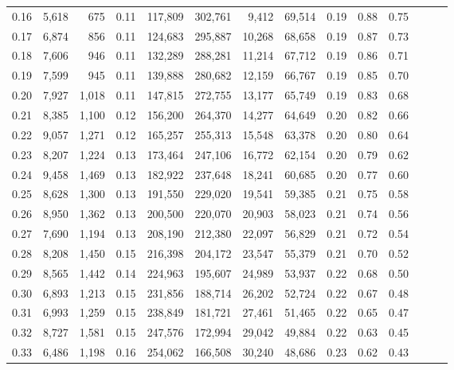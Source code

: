 \begin{tabular}{rrrrrrrrrrrrrr}
0.16 &   5,618 &    675 &  0.11 &  117,809 &  302,761 &   9,412 &  69,514 &  0.19 &  0.88 &      0.75 \\
0.17 &   6,874 &    856 &  0.11 &  124,683 &  295,887 &  10,268 &  68,658 &  0.19 &  0.87 &      0.73 \\
0.18 &   7,606 &    946 &  0.11 &  132,289 &  288,281 &  11,214 &  67,712 &  0.19 &  0.86 &      0.71 \\
0.19 &   7,599 &    945 &  0.11 &  139,888 &  280,682 &  12,159 &  66,767 &  0.19 &  0.85 &      0.70 \\
0.20 &   7,927 &  1,018 &  0.11 &  147,815 &  272,755 &  13,177 &  65,749 &  0.19 &  0.83 &      0.68 \\
0.21 &   8,385 &  1,100 &  0.12 &  156,200 &  264,370 &  14,277 &  64,649 &  0.20 &  0.82 &      0.66 \\
0.22 &   9,057 &  1,271 &  0.12 &  165,257 &  255,313 &  15,548 &  63,378 &  0.20 &  0.80 &      0.64 \\
0.23 &   8,207 &  1,224 &  0.13 &  173,464 &  247,106 &  16,772 &  62,154 &  0.20 &  0.79 &      0.62 \\
0.24 &   9,458 &  1,469 &  0.13 &  182,922 &  237,648 &  18,241 &  60,685 &  0.20 &  0.77 &      0.60 \\
0.25 &   8,628 &  1,300 &  0.13 &  191,550 &  229,020 &  19,541 &  59,385 &  0.21 &  0.75 &      0.58 \\
0.26 &   8,950 &  1,362 &  0.13 &  200,500 &  220,070 &  20,903 &  58,023 &  0.21 &  0.74 &      0.56 \\
0.27 &   7,690 &  1,194 &  0.13 &  208,190 &  212,380 &  22,097 &  56,829 &  0.21 &  0.72 &      0.54 \\
0.28 &   8,208 &  1,450 &  0.15 &  216,398 &  204,172 &  23,547 &  55,379 &  0.21 &  0.70 &      0.52 \\
0.29 &   8,565 &  1,442 &  0.14 &  224,963 &  195,607 &  24,989 &  53,937 &  0.22 &  0.68 &      0.50 \\
0.30 &   6,893 &  1,213 &  0.15 &  231,856 &  188,714 &  26,202 &  52,724 &  0.22 &  0.67 &      0.48 \\
0.31 &   6,993 &  1,259 &  0.15 &  238,849 &  181,721 &  27,461 &  51,465 &  0.22 &  0.65 &      0.47 \\
0.32 &   8,727 &  1,581 &  0.15 &  247,576 &  172,994 &  29,042 &  49,884 &  0.22 &  0.63 &      0.45 \\
0.33 &   6,486 &  1,198 &  0.16 &  254,062 &  166,508 &  30,240 &  48,686 &  0.23 &  0.62 &      0.43 \\

\end{tabular}
